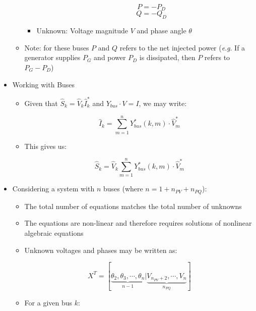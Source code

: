 \begin{itemize}
\begin{itemize}
\begin{itemize}
\begin{itemize}
                $$P=-P_D$$
                $$Q=-Q_D$$

            \end{itemize}

          \item Unknown: Voltage magnitude $V$ and phase angle $\theta$

        \end{itemize}

      \item Note: for these buses $P$ and $Q$ refers to the net injected power (\textit{e}.\textit{g}. If a generator supplies $P_G$ and power $P_D$ is dissipated, then $P$ refers to $P_G-P_D$)

    \end{itemize}

  \item Working with Buses

    \begin{itemize}

      \item Given that $\hat{S}_k=\hat{V}_k\hat{I}_k^*$ and $Y_{bus}\cdot V=I$, we may write:

        $$\hat{I}_k=\sum_{m=1}^n Y_{bus}^*(k,m)\cdot\hat{V}_m^*$$

      \item This gives us:

        $$\hat{S}_k=\hat{V}_k\sum_{m=1}^n Y_{bus}^*(k,m)\cdot\hat{V}^*_m$$

    \end{itemize}

  \item Considering a system with $n$ buses (where $n=1+n_{PV}+n_{PQ}$):

    \begin{itemize}

      \item The total number of equations matches the total number of unknowns

      \item The equations are non-linear and therefore requires solutions of nonlinear algebraic equations

      \item Unknown voltages and phases may be written as:

        $$X^T=[\underbrace{\theta_2,\theta_3,\cdots,\theta_n}_{n-1}\Big| \underbrace{V_{n_{PV}+2},\cdots,V_n}_{n_{PQ}}]$$

      \item For a given bus $k$:


\end{itemize}
\end{itemize}
